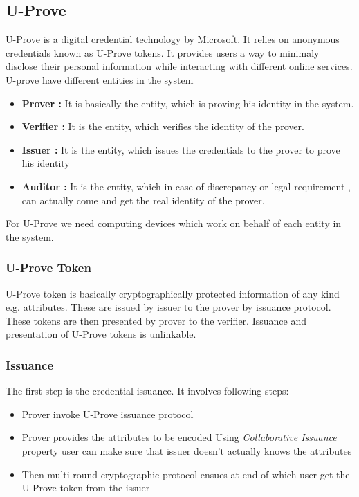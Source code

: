 \subsection{U-Prove}
U-Prove is a digital credential technology by Microsoft\cite{paquin2013u}\cite{paquin2011u}. It relies on anonymous credentials known as U-Prove tokens. It provides users a way to minimaly disclose their personal information while interacting with different online services. U-prove have different entities in the system
\begin{itemize}
	\item \textbf{Prover :} It is basically the entity, which is proving his identity in the system.
	\item \textbf{Verifier :} It is the entity, which verifies the identity of the prover.
	\item \textbf{Issuer :} It is the entity, which issues the credentials to the prover to prove his identity
	\item \textbf{Auditor :} It is the entity, which in case of discrepancy or legal requirement , can actually come and get the real identity of the prover.
\end{itemize}
For U-Prove we need computing devices which work on behalf of each entity in the system.
\subsubsection{U-Prove Token}
U-Prove token is basically cryptographically protected information of any kind e.g. attributes. These are issued by issuer to the prover by issuance protocol. These tokens are then presented by prover to the verifier. Issuance and presentation of U-Prove tokens is unlinkable.
\subsubsection{Issuance}
The first step is the credential issuance. It involves following steps:
\begin{itemize}
	\item Prover invoke U-Prove issuance protocol
	\item Prover provides the attributes to be encoded
	\subitem Using \textit{Collaborative Issuance} property user can make sure that issuer doesn’t actually knows the attributes
	\item Then multi-round cryptographic protocol ensues at end of which user get the U-Prove token from the issuer
\end{itemize}
